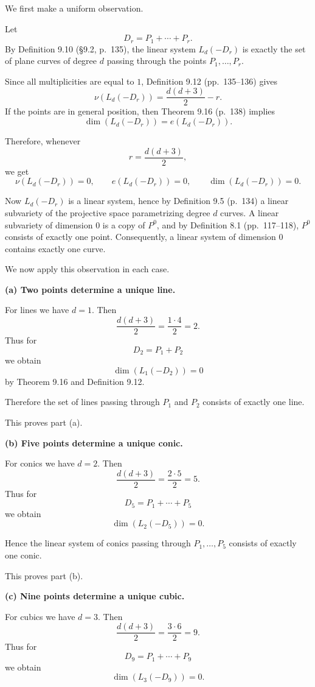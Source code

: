 \documentclass[a4paper,12pt,openany]{article}
\theoremstyle{plain}
\theoremstyle{definition}
\theoremstyle{remark}
\begin{document}
We first make a uniform observation.

Let
\[
D_r=P_1+\cdots+P_r.
\]
By Definition 9.10 (\S9.2, p.~135), the linear system $L_d(-D_r)$ is
exactly the set of plane curves of degree $d$ passing through the points
$P_1,\dots,P_r$.

Since all multiplicities are equal to $1$, Definition 9.12
(pp.~135--136) gives
\[
\nu(L_d(-D_r))=\frac{d(d+3)}{2}-r.
\]
If the points are in general position, then Theorem 9.16 (p.~138) implies
\[
\dim(L_d(-D_r))=e(L_d(-D_r)).
\]

Therefore, whenever
\[
r=\frac{d(d+3)}{2},
\]
we get
\[
\nu(L_d(-D_r))=0,
\qquad
e(L_d(-D_r))=0,
\qquad
\dim(L_d(-D_r))=0.
\]

Now $L_d(-D_r)$ is a linear system, hence by Definition 9.5 (p.~134) a
linear subvariety of the projective space parametrizing degree $d$ curves.
A linear subvariety of dimension $0$ is a copy of $P^0$, and by
Definition 8.1 (pp.~117--118), $P^0$ consists of exactly one point.
Consequently, a linear system of dimension $0$ contains exactly one curve.

We now apply this observation in each case.

\medskip

\noindent\textbf{(a) Two points determine a unique line.}

For lines we have $d=1$. Then
\[
\frac{d(d+3)}{2}=\frac{1\cdot 4}{2}=2.
\]
Thus for
\[
D_2=P_1+P_2
\]
we obtain
\[
\dim(L_1(-D_2))=0
\]
by Theorem 9.16 and Definition 9.12.

Therefore the set of lines passing through $P_1$ and $P_2$ consists of
exactly one line.

This proves part \textup{(a)}.

\medskip

\noindent\textbf{(b) Five points determine a unique conic.}

For conics we have $d=2$. Then
\[
\frac{d(d+3)}{2}=\frac{2\cdot 5}{2}=5.
\]
Thus for
\[
D_5=P_1+\cdots+P_5
\]
we obtain
\[
\dim(L_2(-D_5))=0.
\]

Hence the linear system of conics passing through
$P_1,\dots,P_5$ consists of exactly one conic.

This proves part \textup{(b)}.

\medskip

\noindent\textbf{(c) Nine points determine a unique cubic.}

For cubics we have $d=3$. Then
\[
\frac{d(d+3)}{2}=\frac{3\cdot 6}{2}=9.
\]
Thus for
\[
D_9=P_1+\cdots+P_9
\]
we obtain
\[
\dim(L_3(-D_9))=0.
\]
\end{document}
